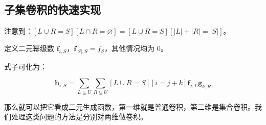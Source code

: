 \documentclass{article}
\begin{document}
\subsection{子集卷积的快速实现}

注意到：$[L\cup R=S][L\cap R=\varnothing]=[L\cup R=S][|L|+|R|=|S|]$。

定义二元幂级数 $\mathbf f_{i,S}$，$\mathbf f_{|S|,S}=f_{S}$，其他情况均为 $0$。

式子可化为：

$$\mathbf h_{i,S}=\sum_{L\subseteq U} \sum_{R\subseteq U} [L \cup R=S][i=j+k] \mathbf f_{j,L} \mathbf g_{k,R}$$

那么就可以把它看成二元生成函数，第一维就是普通卷积，第二维是集合卷积。我们处理这类问题的方法是分别对两维做卷积。


\newpage

\end{document}

